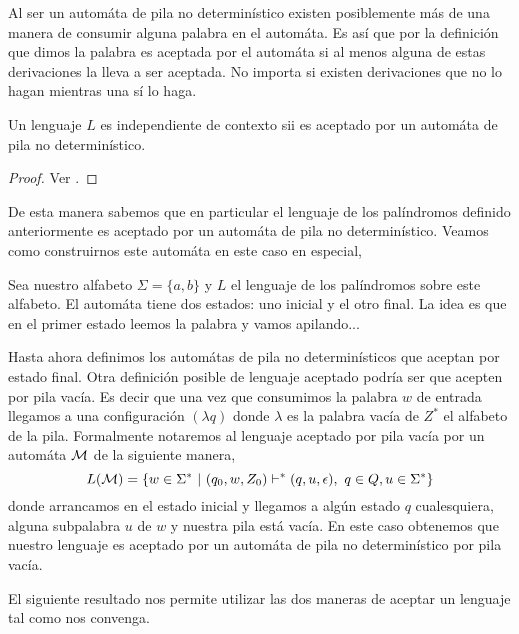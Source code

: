 \documentclass[tesis.tex]{subfiles}
\begin{document}
\begin{obs}
	Al ser un automáta de pila no determinístico existen posiblemente más de una manera de consumir alguna palabra en el automáta. Es así que por la definición que dimos la palabra es aceptada por el automáta si al menos alguna de estas derivaciones la lleva a ser aceptada. No importa si existen derivaciones que no lo hagan mientras una sí lo haga. 
\end{obs}
\medskip
\begin{teo}
Un lenguaje $L$ es independiente de contexto sii es aceptado por un automáta de pila no determinístico.
\end{teo}

\begin{proof}
	Ver \cite{}.
\end{proof}

De esta manera sabemos que en particular el lenguaje de los palíndromos definido anteriormente es aceptado por un automáta de pila no determinístico. Veamos como construirnos este automáta en este caso en especial,
\begin{ej}
	Sea nuestro alfabeto $\Sigma = \{ a, b\}$ y $L$ el lenguaje de los palíndromos sobre este alfabeto. 
	El automáta tiene dos estados: uno inicial y el otro final. La idea es que en el primer estado leemos la palabra y vamos apilando...
\end{ej}


Hasta ahora definimos los automátas de pila no determinísticos que aceptan por estado final. Otra definición posible de lenguaje aceptado podría ser que acepten por pila vacía. Es decir que una vez que consumimos la palabra $w$ de entrada llegamos a una configuración $(\lambda q)$ donde $\lambda$ es la palabra vacía de $Z^*$ el alfabeto de la pila. Formalmente notaremos al lenguaje aceptado por pila vacía por un automáta $\cal M$
de la siguiente manera,
\begin{equation*}
	L({\cal M}) = \{ w \in \Sigma^* \ | \ (q_0,w,Z_0) \vdash^* (q, u, \epsilon), \ q \in Q, u \in \Sigma^*    \}
\end{equation*}
donde arrancamos en el estado inicial y llegamos a algún estado $q$ cualesquiera, alguna subpalabra $u$ de $w$ y nuestra pila está vacía. En este caso obtenemos que nuestro lenguaje es aceptado por un automáta de pila no determinístico por pila vacía.


El siguiente resultado nos permite utilizar las dos maneras de aceptar un lenguaje tal como nos convenga.
\end{document}
